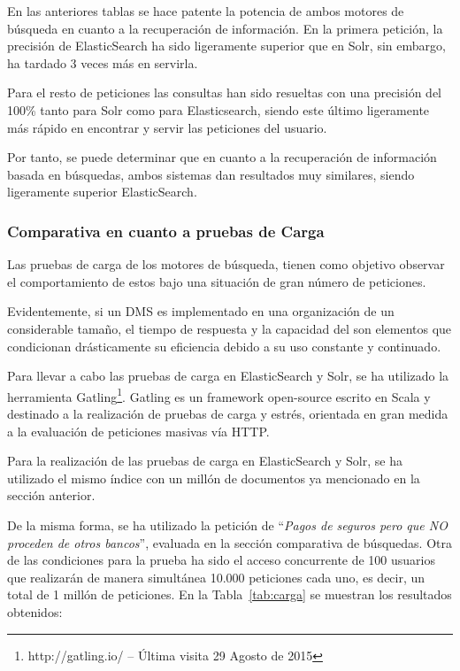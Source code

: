 \documentclass[runningheads,a4paper]{llncs}
\theoremstyle{break}
\begin{document}
En las anteriores tablas se hace patente la potencia de ambos motores de búsqueda en cuanto a la recuperación de información. En la primera petición, la precisión de ElasticSearch ha sido ligeramente superior que en Solr, sin embargo, ha tardado 3 veces más en servirla.

Para el resto de peticiones las consultas han sido resueltas con una precisión del 100\% tanto para Solr como para Elasticsearch, siendo este último ligeramente más rápido en encontrar y servir las peticiones del usuario.

Por tanto, se puede determinar que en cuanto a la recuperación de información basada en búsquedas, ambos sistemas dan resultados muy similares, siendo ligeramente superior ElasticSearch.

\vspace{-1em}
\subsubsection{Comparativa en cuanto a pruebas de Carga}
\textbf{}

Las pruebas de carga de los motores de búsqueda, tienen como objetivo observar el comportamiento de estos bajo una situación de gran número de peticiones. 

Evidentemente, si un DMS es implementado en una organización de un considerable tamaño, el tiempo de respuesta y la capacidad del son elementos que condicionan drásticamente su eficiencia debido a su uso constante y continuado.

Para llevar a cabo las pruebas de carga en ElasticSearch y Solr, se ha utilizado la herramienta Gatling\footnote{http://gatling.io/ -- Última visita 29 Agosto de 2015}. Gatling es un framework open-source escrito en Scala y destinado a la realización de pruebas de carga y estrés, orientada en gran medida a la evaluación de peticiones masivas vía HTTP.

Para la realización de las pruebas de carga en ElasticSearch y Solr, se ha utilizado el mismo índice con un millón de documentos ya mencionado en la sección anterior. 

De la misma forma, se ha utilizado la petición de ``\textit{Pagos de seguros pero que NO proceden de otros bancos}'', evaluada en la sección comparativa de búsquedas. Otra de las condiciones para la prueba ha sido el acceso concurrente de 100 usuarios que realizarán de manera simultánea 10.000 peticiones cada uno, es decir, un total de 1 millón de peticiones. En la Tabla~\ref{tab:carga} se muestran los resultados obtenidos:
\end{document}
